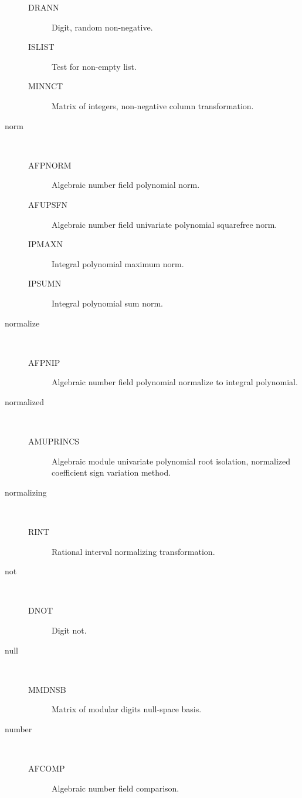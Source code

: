 \begin{description}
\begin{description}
  \item[DRANN]  Digit, random non-negative.
  \item[ISLIST]  Test for non-empty list.
  \item[MINNCT]  Matrix of integers, non-negative column transformation.
  \end{description}
\item[norm] \ \ 
  \begin{description}
  \item[AFPNORM]  Algebraic number field polynomial norm.
  \item[AFUPSFN]  Algebraic number field univariate polynomial squarefree
    norm.
  \item[IPMAXN]  Integral polynomial maximum norm.
  \item[IPSUMN]  Integral polynomial sum norm.
  \end{description}
\item[normalize] \ \ 
  \begin{description}
  \item[AFPNIP]  Algebraic number field polynomial normalize to integral
    polynomial.
  \end{description}
\item[normalized] \ \ 
  \begin{description}
  \item[AMUPRINCS]  Algebraic module univariate polynomial root isolation,
    normalized coefficient sign variation method.
  \end{description}
\item[normalizing] \ \ 
  \begin{description}
  \item[RINT]  Rational interval normalizing transformation.
  \end{description}
\item[not] \ \ 
  \begin{description}
  \item[DNOT]  Digit not.
  \end{description}
\item[null] \ \ 
  \begin{description}
  \item[MMDNSB]  Matrix of modular digits null-space basis.
  \end{description}
\item[number] \ \ 
  \begin{description}
  \item[AFCOMP]  Algebraic number field comparison.

\end{description}
\end{description}

